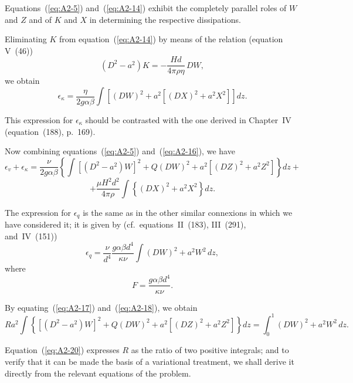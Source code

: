 Equations~(\ref{eq:A2-5}) and~(\ref{eq:A2-14}) exhibit the completely parallel roles of $W$ and $Z$ and of $K$ and $X$ in determining the respective dissipations.

Eliminating $K$ from equation~(\ref{eq:A2-14}) by means of the relation (equation V~(46))
\begin{equation}
\label{eq:A2-15}
(D^2 - a^2)K = -\frac{Hd}{4\pi\rho\eta}\, DW,
\end{equation}
we obtain
\begin{equation}
\label{eq:A2-16}
\epsilon_\kappa = \frac{\eta}{2g\alpha\beta} \int \left[ (DW)^2 + a^2[(DX)^2 + a^2 X^2] \right] dz.
\end{equation}

This expression for $\epsilon_\kappa$ should be contrasted with the one derived in Chapter~IV (equation~(188), p.~169).

Now combining equations~(\ref{eq:A2-5}) and~(\ref{eq:A2-16}), we have
\begin{equation}
\label{eq:A2-17}
\epsilon_v + \epsilon_\kappa = \frac{\nu}{2g\alpha\beta} \left\{ \int \left[(D^2 - a^2)W\right]^2 + Q(DW)^2 + a^2 \left[(DZ)^2 + a^2 Z^2\right] \right\} dz +
\end{equation}
\[
+ \frac{\mu H^2 d^2}{4\pi\rho} \int \left\{ (DX)^2 + a^2 X^2 \right\} dz.
\]

The expression for $\epsilon_q$ is the same as in the other similar connexions in which we have considered it; it is given by (cf.\ equations~II~(183), III~(291), and~IV~(151))
\begin{equation}
\label{eq:A2-18}
\epsilon_q = \frac{\nu}{d^4} \frac{g\alpha\beta d^4}{\kappa\nu} \int (DW)^2 + a^2 W^2 \, dz,
\end{equation}
where
\begin{equation}
\label{eq:A2-19}
F = \frac{g\alpha\beta d^4}{\kappa\nu}.
\end{equation}

By equating~(\ref{eq:A2-17}) and~(\ref{eq:A2-18}), we obtain
\begin{equation}
\label{eq:A2-20}
Ra^2 \int \left\{ [(D^2 - a^2)W]^2 + Q(DW)^2 + a^2[(DZ)^2 + a^2 Z^2] \right\} dz = \int_0^1 (DW)^2 + a^2 W^2 \, dz.
\end{equation}

Equation~(\ref{eq:A2-20}) expresses $R$ as the ratio of two positive integrals; and to verify that it can be made the basis of a variational treatment, we shall derive it directly from the relevant equations of the problem.

